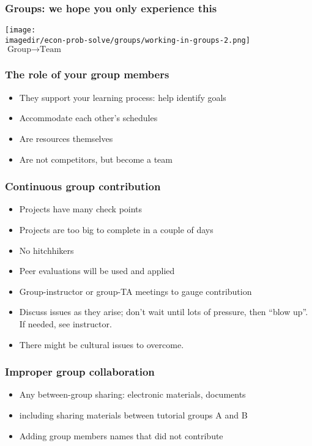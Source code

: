 \begin{frame}\frametitle{Groups: we hope you only experience this}
	\begin{center}
		\texttt{[image: \\imagedir/econ-prob-solve/groups/working-in-groups-2.png]}
		\\
		$\text{Group} \longrightarrow \text{Team}$
	\end{center}	
\end{frame}

\begin{frame}\frametitle{The role of your group members}
	\begin{itemize}
		\item	They support your learning process: help identify goals
		\item	Accommodate each other's schedules		
		\item	Are resources themselves
		\item	Are not competitors, but become a team
	\end{itemize}
\end{frame}

\begin{frame}\frametitle{Continuous group contribution}
	\begin{itemize}
		\item	Projects have many check points
		\item	Projects are too big to complete in a couple of days
		\item	No hitchhikers
		\item	Peer evaluations will be used and applied
		\item	Group-instructor or group-TA meetings to gauge contribution
		\item	Discuss issues as they arise; don't wait until lots of pressure, then ``blow up''.  If needed, see instructor.
		\item	There might be cultural issues to overcome.
	\end{itemize}
\end{frame}

\begin{frame}\frametitle{Improper group collaboration}
	\begin{itemize}
		\item	Any between-group sharing: electronic materials, documents
		\item	including sharing materials between tutorial groups A and B
		\item	Adding group members names that did not contribute
	\end{itemize}
\end{frame}

